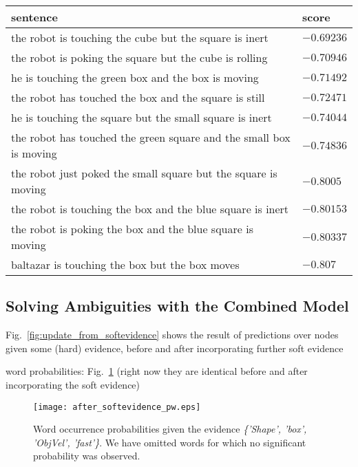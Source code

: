 \begin{table*}
    \centering
    \caption{.}
    \label{tab:conjunction:but}
    \begin{tabular}{ll}
    \toprule
    sentence & score \\
    \midrule
    the robot is touching the cube but the square is inert & $-0.69236$ \\
    the robot is poking the square but the cube is rolling & $-0.70946$ \\
    he is touching the green box and the box is moving & $-0.71492$ \\
    the robot has touched the box and the square is still & $-0.72471$ \\
    he is touching the square but the small square is inert & $-0.74044$ \\
    the robot has touched the green square and the small box is moving & $-0.74836$ \\
    the robot just poked the small square but the square is moving & $-0.8005$ \\
    the robot is touching the box and the blue square is inert & $-0.80153$ \\
    the robot is poking the box and the blue square is moving & $-0.80337$ \\
    baltazar is touching the box but the box moves & $-0.807$ \\
    \bottomrule
    \end{tabular}
\end{table*}

\subsection{Solving Ambiguities with the Combined Model}

Fig.~\ref{fig:update_from_softevidence} shows the result of predictions over nodes given some (hard) evidence, before and after incorporating further soft evidence

\begin{figure*}
    \centering
     \quad
    \caption{.}
    \label{fig:update_from_softevidence}
\end{figure*}

word probabilities: Fig.~\ref{fig:after_softevidence:pw} (right now they are identical before and after incorporating the soft evidence)

\begin{figure}
\centering
\texttt{[image: after\_softevidence\_pw.eps]}
\caption{Word occurrence probabilities given the evidence \emph{\{'Shape', 'box', 'ObjVel', 'fast'\}}. We have omitted words for which no significant probability was observed.}
\label{fig:after_softevidence:pw}
\end{figure}
